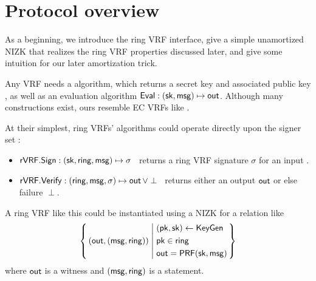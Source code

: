 \section{Protocol overview}
\label{sec:overview}

As a beginning, we introduce the ring VRF interface, give a simple
unamortized NIZK that realizes the ring VRF properties discussed later,
and give some intuition for our later amortization trick.

Any VRF needs a \KeyGen algorithm, which returns a secret key \sk and
associated public key \pk, as well as an evaluation algorithm
${\mathsf{Eval}} : (\mathsf{sk},\mathsf{msg}) \mapsto {\ensuremath{\mathsf{out}}}$. %
%
Although many constructions exist,
 ours resemble EC VRFs like \cite{nsec5,VXEd25519,draft-irtf-cfrg-vrf-10}.

At their simplest, ring VRFs' algorithms could operate directly
upon the signer set \ring:
\begin{itemize}
\item ${\mathsf{rVRF}}.{\mathsf{Sign}} : (\mathsf{sk},\mathsf{ring},\mathsf{msg}) \mapsto \sigma$ \,
    returns a ring VRF signature $\sigma$ for an input \msg.
\item ${\mathsf{rVRF}}.{\mathsf{Verify}} : (\mathsf{ring},\mathsf{msg},\sigma) \mapsto {\ensuremath{\mathsf{out}}} \, \lor \perp$ \,
    returns either an output ${\mathsf{out}}$ or else failure $\perp$.
\end{itemize}

A ring VRF like this could be instantiated using a NIZK for a relation like
$$ \Setst{ (\Out, (\msg, \ring)) }{
    \eprint{
        (\pk,\sk) \leftarrow \KeyGen, \quad %
        \pk \in \ring, \quad
        \Out = \PRF(\sk,\msg)
    }{
        \begin{aligned}
        & (\pk,\sk) \leftarrow \KeyGen \\
        & \pk \in \ring \\
        & \Out = \PRF(\sk,\msg)
        \end{aligned}
    }
} $$
where $ {\mathsf{out}} $ is a witness and $ (\mathsf{msg},\mathsf{ring}) $ is a statement.

